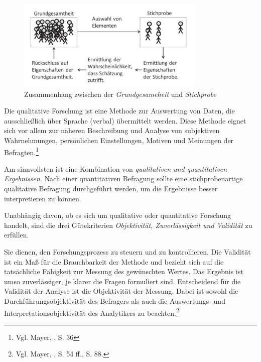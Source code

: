 \begin{figure}[H]
    \centering
    \includegraphics[width=0.8\textwidth]{images/zsmhGrundStich}
    \caption{Zusammenhang zwischen der \textit{Grundgesameheit} und \textit{Stichprobe}\protect\footnotemark}
    \label{fig:GrundgesamtheitStichprobe}
\end{figure}



Die qualitative Forschung ist eine Methode zur Auswertung von Daten, die ausschließlich über Sprache (verbal) übermittelt
werden. Diese Methode eignet sich vor allem zur näheren Beschreibung und Analyse von subjektiven Wahrnehmungen, persönlichen
Einstellungen, Motiven und Meinungen der Befragten.\footnote{Vgl. Mayer, \cite{Interview und schriftliche Befragung}, S. 36}

Am sinnvollsten ist eine Kombination von \textit{qualitativen und quantitativen Ergebnissen}. Nach einer quantitativen
Befragung sollte eine stichprobenartige qualitative Befragung durchgeführt werden, um die Ergebnisse besser interpretieren zu können.

Unabhängig davon, ob es sich um qualitative oder quantitative Forschung handelt, sind die drei Gütekriterien \textit{Objektivität,
Zuverlässigkeit und Validität} zu erfüllen.

Sie dienen, den Forschungsprozess zu steuern und zu kontrollieren. Die Validität ist ein Maß für die Brauchbarkeit der
Methode und bezieht sich auf die tatsächliche Fähigkeit zur Messung des gewünschten Wertes. Das Ergebnis ist umso zuverlässiger,
je klarer die Fragen formuliert sind. Entscheidend für die Validität der Analyse ist die Objektivität der Messung. Dabei
ist sowohl die Durchführungsobjektivität des Befragers als auch die Auswertungs- und Interpretationsobjektivität des
Analytikers zu beachten.\footnote{Vgl. Mayer, \cite{Interview und schriftliche Befragung}, S. 54 ff., S. 88.}

